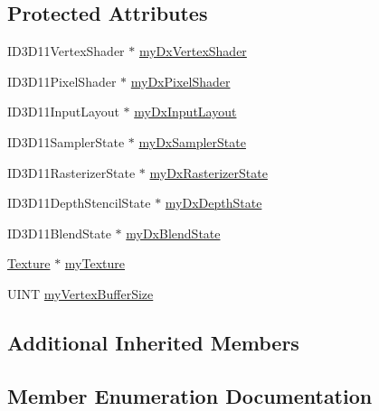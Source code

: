 \subsection*{Protected Attributes}
\begin{DoxyCompactItemize}
\item 
I\+D3\+D11\+Vertex\+Shader $\ast$ \hyperlink{class_material_ada4d417d4e11a3151caba23c6d98ef18}{my\+Dx\+Vertex\+Shader}
\item 
I\+D3\+D11\+Pixel\+Shader $\ast$ \hyperlink{class_material_ab6f46cf000c8d88a47cf11b27ddaff46}{my\+Dx\+Pixel\+Shader}
\item 
I\+D3\+D11\+Input\+Layout $\ast$ \hyperlink{class_material_a72b8f75d4f289a8225c8f924964e4770}{my\+Dx\+Input\+Layout}
\item 
I\+D3\+D11\+Sampler\+State $\ast$ \hyperlink{class_material_a9825413b1ae64cbe5968b8678a68d0b9}{my\+Dx\+Sampler\+State}
\item 
I\+D3\+D11\+Rasterizer\+State $\ast$ \hyperlink{class_material_aa823a3d052a67d1ac95b54368984331e}{my\+Dx\+Rasterizer\+State}
\item 
I\+D3\+D11\+Depth\+Stencil\+State $\ast$ \hyperlink{class_material_a2992d32b4525b2f9e4b0005919ddf76e}{my\+Dx\+Depth\+State}
\item 
I\+D3\+D11\+Blend\+State $\ast$ \hyperlink{class_material_a7ca4cd5b86b5bb28a2223beb16927acb}{my\+Dx\+Blend\+State}
\item 
\hyperlink{class_texture}{Texture} $\ast$ \hyperlink{class_material_a8ff893b848c3392c63898b2951b6ec78}{my\+Texture}
\item 
U\+I\+NT \hyperlink{class_material_af0c062e2928f04c57056fe77f4f47f37}{my\+Vertex\+Buffer\+Size}
\end{DoxyCompactItemize}
\subsection*{Additional Inherited Members}


\subsection{Member Enumeration Documentation}
